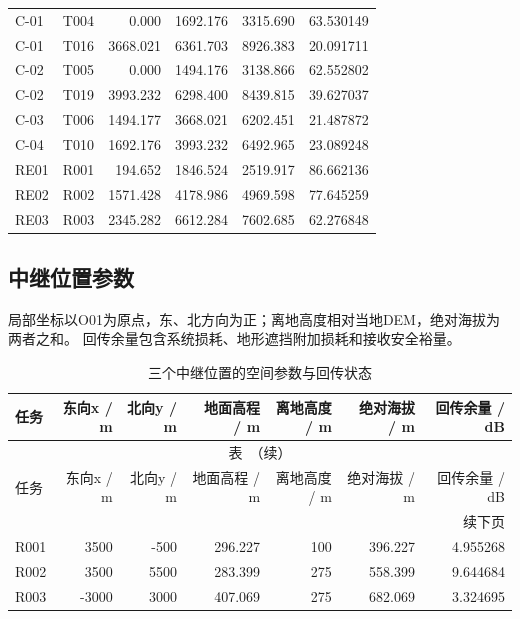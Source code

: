 \begin{longtable}{@{}llrrrr@{}}
C-01 & T004 & 0.000 & 1692.176 & 3315.690 & 63.530149 \\
C-01 & T016 & 3668.021 & 6361.703 & 8926.383 & 20.091711 \\
C-02 & T005 & 0.000 & 1494.176 & 3138.866 & 62.552802 \\
C-02 & T019 & 3993.232 & 6298.400 & 8439.815 & 39.627037 \\
C-03 & T006 & 1494.177 & 3668.021 & 6202.451 & 21.487872 \\
C-04 & T010 & 1692.176 & 3993.232 & 6492.965 & 23.089248 \\
RE01 & R001 & 194.652 & 1846.524 & 2519.917 & 86.662136 \\
RE02 & R002 & 1571.428 & 4178.986 & 4969.598 & 77.645259 \\
RE03 & R003 & 2345.282 & 6612.284 & 7602.685 & 62.276848 \\
\end{longtable}
\endgroup


\subsection{中继位置参数}
局部坐标以O01为原点，东、北方向为正；离地高度相对当地DEM，绝对海拔为两者之和。
回传余量包含系统损耗、地形遮挡附加损耗和接收安全裕量。
\begingroup
\small
\setlength{\tabcolsep}{3pt}
\renewcommand{\arraystretch}{1.10}
\begin{longtable}{@{}lrrrrrr@{}}
\caption{三个中继位置的空间参数与回传状态}\label{tab:q3-relay-geometry}\\
\toprule
任务 & 东向x / m & 北向y / m & 地面高程 / m & 离地高度 / m & 绝对海拔 / m & 回传余量 / dB \\
\midrule
\endfirsthead
\multicolumn{7}{c}{\small 表~\thetable{}（续）}\\
\toprule
任务 & 东向x / m & 北向y / m & 地面高程 / m & 离地高度 / m & 绝对海拔 / m & 回传余量 / dB \\
\midrule
\endhead
\midrule
\multicolumn{7}{r}{\small 续下页}\\
\endfoot
\bottomrule
\endlastfoot
R001 & 3500 & -500 & 296.227 & 100 & 396.227 & 4.955268 \\
R002 & 3500 & 5500 & 283.399 & 275 & 558.399 & 9.644684 \\
R003 & -3000 & 3000 & 407.069 & 275 & 682.069 & 3.324695 \\
\end{longtable}
\endgroup

\par\endgroup
